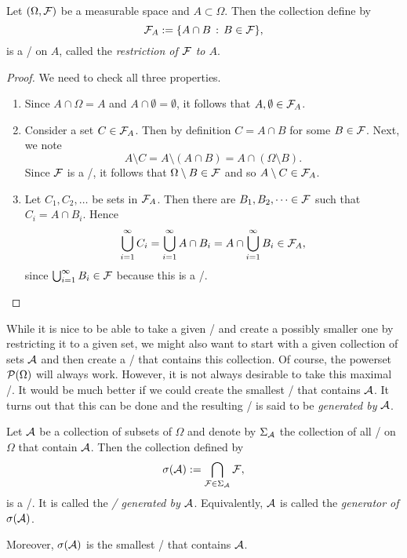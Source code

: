 \begin{lemma}\label{lem:restriction_sigma_algebra}
Let $(\Omega, \mathcal F)$ be a measurable space and $A \subset \Omega$. Then the collection define by 
\[
	\mathcal F_A := \{A \cap B \, : \, B \in \mathcal F\},
\]
is a \sigalg/ on $A$, called the \emph{restriction of $\mathcal F$ to $A$}.
\end{lemma}

\begin{proof}
We need to check all three properties.
\begin{enumerate}
\item Since $A \cap \Omega = A$ and $A \cap \emptyset = \emptyset$, it follows that $A, \emptyset \in \mathcal F_A$.
\item Consider a set $C \in \mathcal F_A$. Then by definition $C = A \cap B$ for some $B \in \mathcal F$. Next, we note
\[
	A \setminus C = A \setminus (A \cap B) = A \cap (\Omega \setminus B).
\]
Since $\mathcal F$ is a \sigalg/, it follows that $\Omega \setminus B \in \mathcal F$ and so $A \setminus C \in \mathcal F_A$.
\item Let $C_1, C_2, \dots$ be sets in $\mathcal F_A$. Then there are $B_1, B_2, \dots \in \mathcal F$ such that $C_i = A \cap B_i$. Hence
\[
	\bigcup_{i=1}^\infty C_i = \bigcup_{i=1}^\infty A \cap B_i = A \cap \bigcup_{i=1}^\infty B_i \in \mathcal F_A,
\]
since $\bigcup_{i=1}^\infty B_i \in \mathcal F$ because this is a \sigalg/.
\end{enumerate}
\end{proof}

While it is nice to be able to take a given \sigalg/ and create a possibly smaller one by restricting it to a given set, we might also want to start with a given collection of sets $\mathcal A$ and then create a \sigalg/ that contains this collection. Of course, the powerset $\mathcal P(\Omega)$ will always work. However, it is not always desirable to take this maximal \sigalg/. It would be much better if we could create the smallest \sigalg/ that contains $\mathcal A$. It turns out that this can be done and the resulting \sigalg/ is said to be \emph{generated by $\mathcal A$}. 

\begin{proposition}\label{prop:generated_sigalg}
Let $\mathcal A$ be a collection of subsets of $\Omega$ and denote by $\Sigma_{\mathcal A}$ the collection of all \sigalgs/ on $\Omega$ that contain $\mathcal A$. Then the collection defined by
\[
	\sigma(\mathcal A) := \bigcap_{\mathcal F \in \Sigma_{\mathcal A}} \mathcal F,
\]
is a \sigalg/. It is called the \emph{\sigalg/ generated by $\mathcal A$}. Equivalently, $\mathcal A$ is called the \emph{generator of $\sigma(\mathcal A)$}.

Moreover, $\sigma(\mathcal A)$ is the smallest \sigalg/ that contains $\mathcal A$. 
\end{proposition}

